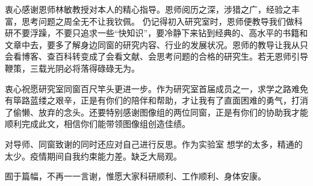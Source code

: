 \begin{acknowledgement}
    衷心感谢恩师林敏教授对本人的精心指导。恩师阅历之深，涉猎之广，经验之丰富，思考问题之周全无不让我钦佩。
    仍记得初入研究室时，恩师便教导我们做科研不要浮躁，不要只追求一些“快知识”，要冷静下来钻到经典的、高水平的书籍和文章中去，要多了解身边同窗的研究内容、行业的发展状况。恩师的教导让我从只会看博客、查百科转变成了会看文献、会思考问题的合格的研究生。若无恩师引导鞭策，三载光阴必将落得碌碌无为。

    衷心祝愿研究室同窗百尺竿头更进一步。作为研究室首届成员之一，求学之路难免有筚路蓝缕之艰辛，正是有你们的陪伴和帮助，才让我有了直面困难的勇气，打消了偷懒、放弃的念头。还要特别感谢图像组的两位同窗，正是有你们的协助我才能顺利完成此文，相信你们能带领图像组创造佳绩。

    对导师、同窗致谢的同时还应对自己进行反思。作为实验室 想学的太多，精通的太少。疫情期间自我约束能力差。缺乏大局观。

    囿于篇幅，不再一一言谢，惟愿大家科研顺利、工作顺利、身体安康。
\end{acknowledgement}
